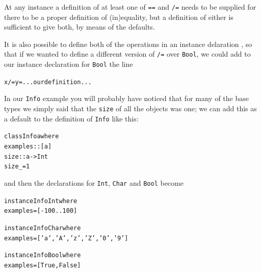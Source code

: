 At any
instance a definition of at least one of \texttt{==} and
\texttt{/=} needs to be supplied for there to be a proper definition of (in)equality, but a
definition of either is sufficient to give both, by means of the
defaults.

It is also possible to define both of the operations in an instance
delaration , so that if we wanted to
define a different version of \texttt{/=} over \texttt{Bool}, we could add to our
instance declaration for \texttt{Bool} the line
\begin{alltt}
  x /= y     = ... our definition ...
\end{alltt}
In our \texttt{Info} example you will probably have noticed that for many of the base types we simply said that the \texttt{size} of all the objects was one; we can add this as a default to the definition of \texttt{Info} like this:
\begin{alltt}
class Info a where
  examples :: [a]
  size     :: a -> Int
  size _   = 1
\end{alltt}
and then the declarations for \texttt{Int}, \texttt{Char} and \texttt{Bool} become  
\begin{alltt}
instance Info Int where
  examples = [-100..100]

instance Info Char where
  examples = ['a','A','z','Z','0','9']

instance Info Bool where
  examples = [True,False]
\end{alltt}




